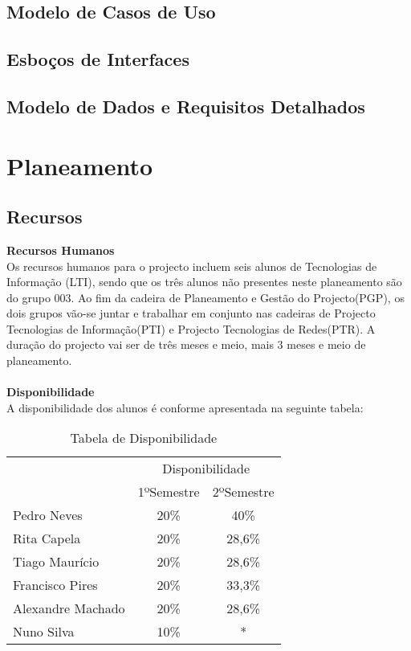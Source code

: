 \documentclass[12pt, a4paper, twoside]{report} %
\begin{document}
\section{Modelo de Casos de Uso}

\section{Esboços de Interfaces}

\section{Modelo de Dados e Requisitos Detalhados}

\chapter{Planeamento}

\section{Recursos}

\textbf{Recursos Humanos}
\\

Os recursos humanos para o projecto incluem seis alunos de Tecnologias de Informação (LTI), sendo que os três alunos não presentes neste planeamento são do grupo 003.
Ao fim da cadeira de Planeamento e Gestão do Projecto(PGP), os dois grupos vão-se juntar e trabalhar em conjunto nas cadeiras de Projecto Tecnologias de Informação(PTI) e Projecto Tecnologias de Redes(PTR). A duração do projecto vai ser de três meses e meio, mais 3 meses e meio de planeamento. 
\\
\\
\textbf{Disponibilidade}
\\

A disponibilidade dos alunos é conforme apresentada na seguinte tabela:

\begin{table}[h]
\centering
\begin{tabular}{|l|c|c|}
\hline
\multirow{2}{*}{} & \multicolumn{2}{c|}{Disponibilidade} \\ \cline{2-3} 
                  & 1ºSemestre        & 2ºSemestre       \\ \hline
Pedro Neves       & 20\%              & 40\%             \\ \hline
Rita Capela       & 20\%              & 28,6\%           \\ \hline
Tiago Maurício    & 20\%              & 28,6\%           \\ \hline
Francisco Pires   & 20\%              & 33,3\%           \\ \hline
Alexandre Machado & 20\%              & 28,6\%           \\ \hline
Nuno Silva        & 10\%              & *                \\ \hline
\end{tabular}
\caption{Tabela de Disponibilidade}
\label{disponibilidade}
\end{table}
\end{document}
